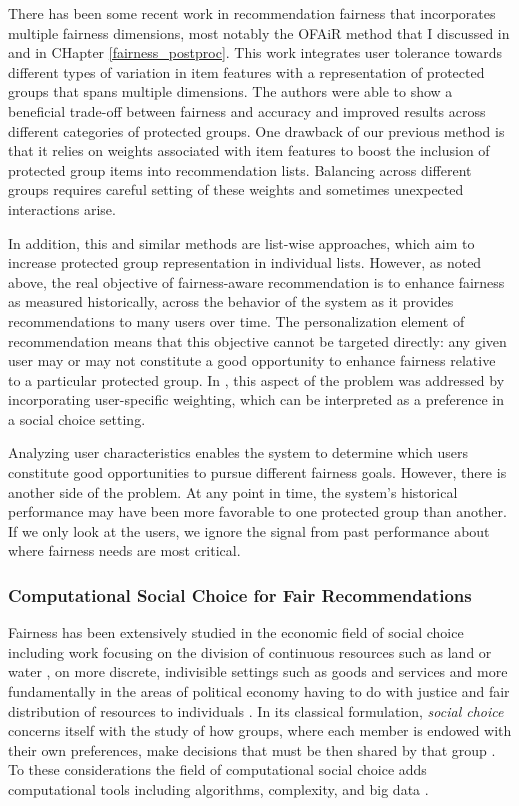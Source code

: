 There has been some recent work in recommendation fairness that incorporates multiple fairness dimensions, most notably the OFAiR method that I discussed in \cite{sonboli-umap-2020} and in CHapter \ref{fairness_postproc}. This work integrates user tolerance towards different types of variation in item features with a representation of protected groups that spans multiple dimensions. The authors were able to show a beneficial trade-off between fairness and accuracy and improved results across different categories of protected groups. One drawback of our previous method \cite{sonboli-umap-2020} is that it relies on weights associated with item features to boost the inclusion of protected group items into recommendation lists. Balancing across different groups requires careful setting of these weights and sometimes unexpected interactions arise.

In addition, this and similar methods are list-wise approaches, which aim to increase protected group representation in individual lists. However, as noted above, the real objective of fairness-aware recommendation is to enhance fairness as measured historically, across the behavior of the system as it provides recommendations to many users over time. The personalization element of recommendation means that this objective cannot be targeted directly: any given user may or may not constitute a good opportunity to enhance fairness relative to a particular protected group. In \cite{sonboli-umap-2020}, this aspect of the problem was addressed by incorporating user-specific weighting, which can be interpreted as a preference in a social choice setting. 

Analyzing user characteristics enables the system to determine which users constitute good opportunities to pursue different fairness goals. However, there is another side of the problem. At any point in time, the system's historical performance may have been more favorable to one protected group than another. If we only look at the users, we ignore the signal from past performance about where fairness needs are most critical.


\subsubsection{Computational Social Choice for Fair Recommendations} 
Fairness has been extensively studied in the economic field of social choice including work focusing on the division of continuous resources such as land or water \cite{Moulin:FairDivision}, on more discrete, indivisible settings such as goods and services \cite{Thomson:FairRules,Thomson:IntroFairAllocation} and more fundamentally in the areas of political economy having to do with justice and fair distribution of resources to individuals \cite{Young:Equity,Rawls:Justice,Rescher:Justice}. In its classical formulation, \emph{social choice} concerns itself with the study of how groups, where each member is endowed with their own preferences, make decisions that must be then shared by that group \cite{Sen:CollectiveChoice}. To these considerations the field of computational social choice adds computational tools including algorithms, complexity, and big data \cite{BCELP16a,DBLP:conf/ijcai/Mattei20}.


